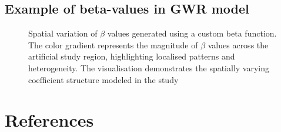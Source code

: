 \documentclass[
  default,
]{sn-jnl}
\begin{document}
\begin{table}
{}

\end{table}%

\subsection*{Example of beta-values in GWR
model}\label{example-of-beta-values-in-gwr-model}

\label{cell-fig-betaplot}
\begin{figure}[H]


\caption{\label{fig-betaplot}Spatial variation of \(\beta\) values
generated using a custom beta function. The color gradient represents
the magnitude of \(\beta\) values across the artificial study region,
highlighting localised patterns and heterogeneity. The visualisation
demonstrates the spatially varying coefficient structure modeled in the
study}

\end{figure}%

\section*{References}\label{references}
\end{document}
